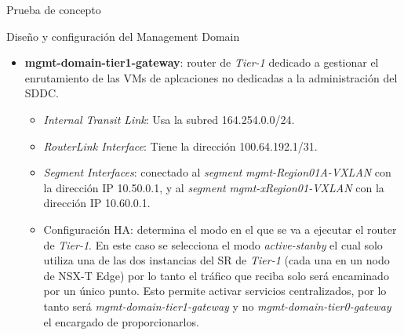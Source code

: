 \begin{section}{Prueba de concepto}
\begin{subsection}{Diseño y configuración del Management Domain}
\begin{itemize}
      \item \textbf{mgmt-domain-tier1-gateway}: router de \textit{Tier-1} dedicado a gestionar el enrutamiento de las VMs de aplcaciones no dedicadas a la administración del SDDC. 
      \begin{itemize}
        \item \textit{Internal Transit Link}: Usa la subred 164.254.0.0/24.
        \item \textit{RouterLink Interface}: Tiene la dirección 100.64.192.1/31.
        \item \textit{Segment Interfaces}: conectado al \textit{segment} \textit{mgmt-Region01A-VXLAN} con la dirección IP 10.50.0.1, y al \textit{segment} \textit{mgmt-xRegion01-VXLAN} con la dirección IP 10.60.0.1.
        \item Configuración HA: determina el modo en el que se va a ejecutar el router de \textit{Tier-1}. En este caso se selecciona el modo \textit{active-stanby} el cual solo utiliza una de las dos instancias del SR de \textit{Tier-1} (cada una en un nodo de NSX-T Edge) por lo tanto el tráfico que reciba solo será encaminado por un único punto. Esto permite activar servicios centralizados, por lo tanto será \textit{mgmt-domain-tier1-gateway} y no \textit{mgmt-domain-tier0-gateway} el encargado de proporcionarlos.
      \end{itemize}
    \end{itemize}
    
      
      

\end{subsection}
\end{section}
